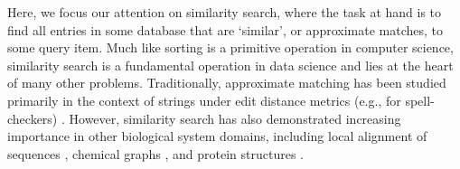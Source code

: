 \documentclass[review,preprint,12pt]{elsarticle}
\renewcommand{\cite}{\citep} %
\theoremstyle{definition}
\theoremstyle{remark}
\numberwithin{equation}{section}
\begin{document}
Here, we focus our attention on similarity search, where the task at hand is to find all entries in some database that are `similar', or approximate matches, to some query item.
Much like sorting is a primitive operation in computer science, similarity search is a fundamental operation in data science and lies at the heart of many other problems.
Traditionally, approximate matching has been studied primarily in the context of strings under edit distance metrics (e.g., for spell-checkers) \cite{ukkonen1985algorithms}.
However, similarity search has also demonstrated increasing importance in other biological system domains, including local alignment of sequences \cite{altschul1990basic, kent2002blat}, chemical graphs \cite{schaeffer2007graph}, and protein structures \cite{budowski2010fragbag}.
\end{document}

